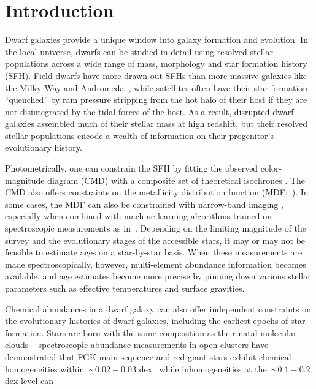 
\section{Introduction}
\label{dga:sec:intro}

Dwarf galaxies provide a unique window into galaxy formation and evolution.
In the local universe, dwarfs can be studied in detail using resolved stellar
populations across a wide range of mass, morphology and star formation history
(SFH).
Field dwarfs have more drawn-out SFHs than more massive galaxies like the Milky
Way and Andromeda~\citep[e.g.,][]{Behroozi2019, GarrisonKimmel2019}, while
satellites often have their star formation ``quenched'' by ram pressure
stripping from the hot halo of their host
\citep*[see discussion in, e.g.,][]{Steyrleithner2020} if they are not
disintegrated by the tidal forces of the host.
As a result, disrupted dwarf galaxies assembled much of their stellar mass at
high redshift, but their resolved stellar populations encode a wealth of
information on their progenitor's evolutionary history.
\par
Photometrically, one can constrain the SFH by fitting the observed
color-magnitude diagram (CMD) with a composite set of theoretical isochrones
\citep[e.g.,][]{Dolphin2002, Weisz2014b}.
The CMD also offers constraints on the metallicity distribution function
(MDF;~\citealp*[e.g.,][]{Lianou2011}).
In some cases, the MDF can also be constrained with narrow-band imaging
\citep{Fu2022}, especially when combined with machine learning algorithms
trained on spectroscopic measurements as in~\citet{Whitten2021}.
Depending on the limiting magnitude of the survey and the evolutionary stages
of the accessible stars, it may or may not be feasible to estimate ages on a
star-by-star basis.
When these measurements are made spectroscopically, however, multi-element
abundance information becomes available, and age estimates become more precise
by pinning down various stellar parameters such as effective temperatures and
surface gravities.
\par
Chemical abundances in a dwarf galaxy can also offer independent constraints
on the evolutionary histories of dwarf galaxies, including the earliest epochs
of star formation.
Stars are born with the same composition as their natal molecular clouds --
spectroscopic abundance measurements in open clusters have demonstrated that
FGK main-sequence and red giant stars exhibit chemical homogeneities
within~$\sim$$0.02 - 0.03$ dex~\citep{DeSilva2006, Bovy2016a, Liu2016b,
Casamiquela2020} while inhomogeneities at the~$\sim$$0.1 - 0.2$ dex level can
